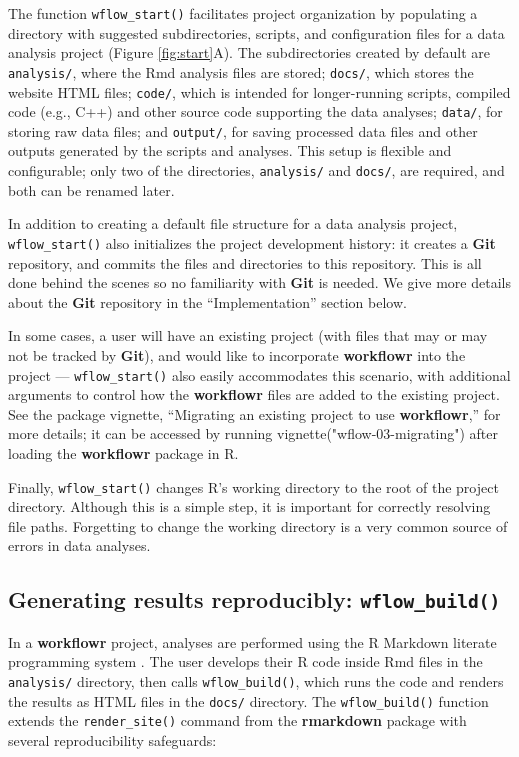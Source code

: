 \documentclass[9pt,a4paper]{extarticle}
\begin{document}
The function \texttt{wflow\_start()} facilitates project organization by
populating a directory with suggested subdirectories, scripts, and
configuration files for a data analysis project (Figure \ref{fig:start}A). The
subdirectories created by default are \texttt{analysis/}, where the Rmd
analysis files are stored; \texttt{docs/}, which stores the website HTML
files; \texttt{code/}, which is intended for longer-running scripts,
compiled code (e.g., C++) and other source code supporting the data
analyses; \texttt{data/}, for storing raw data files; and \texttt{output/},
for saving processed data files and other outputs generated by the
scripts and analyses. This setup is flexible and configurable; only two
of the directories, \texttt{analysis/} and \texttt{docs/}, are required, and
both can be renamed later.

In addition to creating a default file structure for a data analysis
project, \texttt{wflow\_start()} also initializes the project development history:
it creates a \textbf{Git} repository, and commits the files and directories to
this repository. This is all done behind the scenes so no familiarity
with \textbf{Git} is needed. We give more details about the \textbf{Git} repository in the
``Implementation'' section below.

In some cases, a user will have an existing project (with files that may
or may not be tracked by \textbf{Git}), and would like to incorporate \textbf{workflowr}
into the project --- \texttt{wflow\_start()} also easily accommodates this
scenario, with additional arguments to control how the \textbf{workflowr} files
are added to the existing project. See the package vignette, ``Migrating
an existing project to use \textbf{workflowr},'' for more details; it can be
accessed by running vignette("wflow-03-migrating") after loading the
 \textbf{workflowr} package in R.

Finally, \texttt{wflow\_start()} changes R’s working directory to the root of the
project directory. Although this is a simple step, it is important for
correctly resolving file paths. Forgetting to change the working
directory is a very common source of errors in data analyses.

\subsection*{Generating results reproducibly: \texttt{wflow\_build()}}

In a \textbf{workflowr} project, analyses are performed using the R Markdown
literate programming system \cite{Xie2018}. The user develops their R
code inside Rmd files in the \texttt{analysis/} directory, then calls
\texttt{wflow\_build()}, which runs the code and renders the results as HTML files
in the \texttt{docs/} directory. The \texttt{wflow\_build()} function extends the
\texttt{render\_site()} command from the \textbf{rmarkdown} package with several
reproducibility safeguards:
\end{document}
